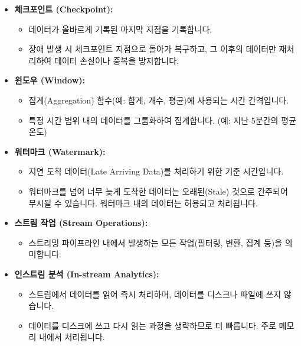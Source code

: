 \documentclass[11pt,a4paper]{article}
\theoremstyle{definition}
\begin{document}
\begin{itemize}
\begin{itemize}
        \item \textbf{Append (추가):} 새로운 데이터만 추가합니다.
        \item \textbf{Overwrite (덮어쓰기):} 기존 데이터를 모두 삭제하고 새로운 데이터로 덮어씁니다.
        \item \textbf{Update (업데이트):} 기존 데이터를 업데이트하거나 새로운 데이터를 추가합니다.
    \end{itemize}
    \item \textbf{체크포인트 (Checkpoint):}
    \begin{itemize}
        \item 데이터가 올바르게 기록된 마지막 지점을 기록합니다.
        \item 장애 발생 시 체크포인트 지점으로 돌아가 복구하고, 그 이후의 데이터만 재처리하여 데이터 손실이나 중복을 방지합니다.
    \end{itemize}
    \item \textbf{윈도우 (Window):}
    \begin{itemize}
        \item 집계(Aggregation) 함수(예: 합계, 개수, 평균)에 사용되는 시간 간격입니다.
        \item 특정 시간 범위 내의 데이터를 그룹화하여 집계합니다. (예: 지난 5분간의 평균 온도)
    \end{itemize}
    \item \textbf{워터마크 (Watermark):}
    \begin{itemize}
        \item 지연 도착 데이터(Late Arriving Data)를 처리하기 위한 기준 시간입니다.
        \item 워터마크를 넘어 너무 늦게 도착한 데이터는 오래된(Stale) 것으로 간주되어 무시될 수 있습니다. 워터마크 내의 데이터는 허용되고 처리됩니다.
    \end{itemize}
    \item \textbf{스트림 작업 (Stream Operations):}
    \begin{itemize}
        \item 스트리밍 파이프라인 내에서 발생하는 모든 작업(필터링, 변환, 집계 등)을 의미합니다.
    \end{itemize}
    \item \textbf{인스트림 분석 (In-stream Analytics):}
    \begin{itemize}
        \item 스트림에서 데이터를 읽어 즉시 처리하며, 데이터를 디스크나 파일에 쓰지 않습니다.
        \item 데이터를 디스크에 쓰고 다시 읽는 과정을 생략하므로 더 빠릅니다. 주로 메모리 내에서 처리됩니다.
    \end{itemize}
\end{itemize}
\end{document}
